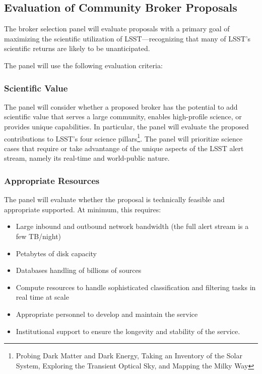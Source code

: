 \subsection{Evaluation of Community Broker Proposals} \label{sec:evaluation}

The broker selection panel will evaluate proposals with a primary goal of maximizing the scientific utilization of LSST---recognizing that many of LSST's scientific returns are likely to be unanticipated.

The panel will use the following evaluation criteria:

\subsubsection{Scientific Value}

The panel will consider whether a proposed broker has the potential to add scientific value that serves a large community, enables high-profile science, or provides unique capabilities.
In particular, the panel will evaluate the proposed contributions to LSST's four science pillars\footnote{Probing Dark Matter and Dark Energy, Taking an Inventory of the Solar System, Exploring the Transient Optical Sky, and Mapping the Milky Way}.
The panel will prioritize science cases that require or take advantange of the unique aspects of the LSST alert stream, namely its real-time and world-public nature.

\subsubsection{Appropriate Resources}

The panel will evaluate whether the proposal is technically feasible and appropriate supported.  At minimum, this requires:

\begin{itemize}
	\item Large inbound and outbound network bandwidth (the full alert stream is a few TB/night)
	\item Petabytes of disk capacity
	\item Databases handling of billions of sources
	\item Compute resources to handle sophisticated classification and filtering tasks in real time at scale
	\item Appropriate personnel to develop and maintain the service
	\item Institutional support to ensure the longevity and stability of the service.
\end{itemize}


